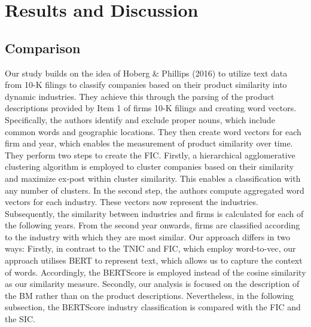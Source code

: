\documentclass[
]{article}
\begin{document}
\section{Results and Discussion}\label{results-and-discussion}

\subsection{Comparison}\label{comparison}

Our study builds on the idea of Hoberg \& Phillips (2016) to utilize
text data from 10-K filings to classify companies based on their product
similarity into dynamic industries. They achieve this through the
parsing of the product descriptions provided by Item 1 of firms 10-K
filings and creating word vectors. Specifically, the authors identify
and exclude proper nouns, which include common words and geographic
locations. They then create word vectors for each firm and year, which
enables the measurement of product similarity over time. They perform
two steps to create the FIC. Firstly, a hierarchical agglomerative
clustering algorithm is employed to cluster companies based on their
similarity and maximize ex-post within cluster similarity. This enables
a classification with any number of clusters. In the second step, the
authors compute aggregated word vectors for each industry. These vectors
now represent the industries. Subsequently, the similarity between
industries and firms is calculated for each of the following years. From
the second year onwards, firms are classified according to the industry
with which they are most similar. Our approach differs in two ways:
Firstly, in contrast to the TNIC and FIC, which employ word-to-vec, our
approach utilises BERT to represent text, which allows us to capture the
context of words. Accordingly, the BERTScore is employed instead of the
cosine similarity as our similarity measure. Secondly, our analysis is
focused on the description of the BM rather than on the product
descriptions. Nevertheless, in the following subsection, the BERTScore
industry classification is compared with the FIC and the SIC.
\end{document}
